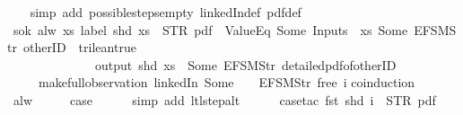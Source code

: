\begin{isabellebody}
\ \ \isamarkupfalse%
\ {\isacharparenleft}simp\ add{\isacharcolon}\ possible{\isacharunderscore}steps{\isacharunderscore}empty\ linkedIn{\isacharunderscore}def\ pdf{}{\isacharunderscore}def{\isacharparenright}%
\endisatagproof
{\isafoldproof}%
%
\isadelimproof
\isanewline
%
\endisadelimproof
\isanewline
{}\isamarkupfalse%
\ s{}{\isacharunderscore}ok{\isacharcolon}\ {\isachardoublequoteopen}alw\ {\isacharparenleft}{\isasymlambda}xs{\isachardot}\ label\ {\isacharparenleft}shd\ xs{\isacharparenright}\ {\isacharequal}\ STR\ {\isacharprime}{\isacharprime}pdf{\isacharprime}{\isacharprime}\ {\isasymand}\ ValueEq\ {\isacharparenleft}Some\ {\isacharparenleft}Inputs\ {}\ xs{\isacharparenright}{\isacharparenright}\ {\isacharparenleft}Some\ {\isacharparenleft}EFSM{\isachardot}Str\ {\isacharprime}{\isacharprime}otherID{\isacharprime}{\isacharprime}{\isacharparenright}{\isacharparenright}\ {\isacharequal}\ trilean{\isachardot}true\ {\isasymlongrightarrow}\isanewline
\ \ \ \ \ \ \ \ \ \ \ \ \ \ output\ {\isacharparenleft}shd\ xs{\isacharparenright}\ {\isasymnoteq}\ {\isacharbrackleft}Some\ {\isacharparenleft}EFSM{\isachardot}Str\ {\isacharprime}{\isacharprime}detailed{\isacharunderscore}pdf{\isacharunderscore}of{\isacharunderscore}otherID{\isacharprime}{\isacharprime}{\isacharparenright}{\isacharbrackright}{\isacharparenright}\isanewline
\ \ \ \ \ {\isacharparenleft}make{\isacharunderscore}full{\isacharunderscore}observation\ linkedIn\ {\isacharparenleft}Some\ {}{\isacharparenright}\ {\isacharless}{}\ {\isacharcolon}{\isacharequal}\ EFSM{\isachardot}Str\ {\isacharprime}{\isacharprime}free{\isacharprime}{\isacharprime}{\isachargreater}\ i{\isacharparenright}{\isachardoublequoteclose}\isanewline
%
\isadelimproof
%
\endisadelimproof
%
\isatagproof
{}\isamarkupfalse%
{\isacharparenleft}coinduction{\isacharparenright}\isanewline
\ \ \isamarkupfalse%
\ alw\isanewline
\ \ \isamarkupfalse%
\ \isamarkupfalse%
\ {\isacharquery}case\isanewline
\ \ \ \ \isamarkupfalse%
\ {\isacharparenleft}simp\ add{\isacharcolon}\ ltl{\isacharunderscore}step{\isacharunderscore}alt{\isacharparenright}\isanewline
\ \ \ \ \isamarkupfalse%
\ {\isacharparenleft}case{\isacharunderscore}tac\ {\isachardoublequoteopen}fst\ {\isacharparenleft}shd\ i{\isacharparenright}\ {\isacharequal}\ STR\ {\isacharprime}{\isacharprime}pdf{\isacharprime}{\isacharprime}{\isachardoublequoteclose}{\isacharparenright}\isanewline
\ \ \ \ \ \isamarkupfalse%

\end{isabellebody}
